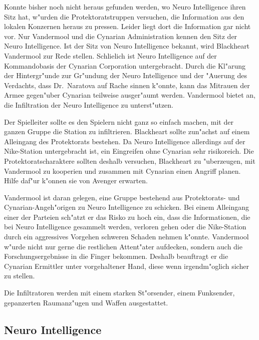 Konnte bisher noch nicht heraus gefunden werden, wo Neuro Intelligence ihren Sitz hat, w"urden die Protektoratstruppen versuchen, die Information aus den lokalen Konzernen heraus zu pressen. Leider liegt dort die Information gar nicht vor. Nur Vandermool und die Cynarian Administration kennen den Sitz der Neuro Intelligence. Ist der Sitz von Neuro Intelligence bekannt, wird Blackheart Vandermool zur Rede stellen. Schlie\3lich ist Neuro Intelligence auf der Kommandobasis der Cynarian Corporation untergebracht. Durch die Kl"arung der Hintergr"unde zur Gr"undung der Neuro Intelligence und der "Au\3erung des Verdachts, dass Dr.~Naratova auf Rache sinnen k"onnte, kann das Mi\3trauen der Armee gegen"uber Cynarian teilweise ausger"aumt werden. Vandermool bietet an, die Infiltration der Neuro Intelligence zu unterst"utzen.

\begin{remarks}
	Der Spielleiter sollte es den Spielern nicht ganz so einfach machen, mit der ganzen Gruppe die Station zu infiltrieren. Blackheart sollte zun"achst auf einem Alleingang des Protektorats bestehen. Da Neuro Intelligence allerdings auf der Nike-Station untergebracht ist, ein Eingreifen ohne Cynarian sehr risikoreich. Die Protektoratscharaktere sollten deshalb versuchen, Blackheart zu "uberzeugen, mit Vandermool zu kooperien und zusammen mit Cynarian einen Angriff planen. Hilfe daf"ur k"onnen sie von Avenger erwarten.
	
	Vandermool ist daran gelegen, eine Gruppe bestehend aus Protektorats- und Cynarian-Angeh"origen zu Neuro Intelligence zu schicken. Bei einem Alleingang einer der Parteien sch"atzt er das Risko zu hoch ein, dass die Informationen, die bei Neuro Intelligence gesammelt werden, verloren gehen oder die Nike-Station durch ein aggressives Vorgehen schweren Schaden nehmen k"onnte. Vandermool w"urde nicht nur gerne die restlichen Attent"ater aufdecken, sondern auch die Forschungsergebnisse in die Finger bekommen. Deshalb beauftragt er die Cynarian Ermittler unter vorgehaltener Hand, diese wenn irgendm"oglich sicher zu stellen.
	
	Die Infiltratoren werden mit einem starken St"orsender, einem Funksender, gepanzerten Raumanz"ugen und Waffen ausgestattet.
\end{remarks}

\subsection{Neuro Intelligence}

